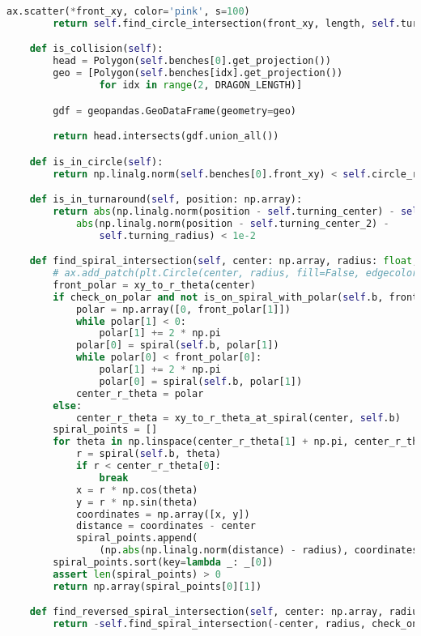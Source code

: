 \begin{lstlisting}[language=python]
        ax.scatter(*front_xy, color='pink', s=100)
        return self.find_circle_intersection(front_xy, length, self.turning_center, self.turning_radius)

    def is_collision(self):
        head = Polygon(self.benches[0].get_projection())
        geo = [Polygon(self.benches[idx].get_projection())
                for idx in range(2, DRAGON_LENGTH)]

        gdf = geopandas.GeoDataFrame(geometry=geo)

        return head.intersects(gdf.union_all())

    def is_in_circle(self):
        return np.linalg.norm(self.benches[0].front_xy) < self.circle_radius

    def is_in_turnaround(self, position: np.array):
        return abs(np.linalg.norm(position - self.turning_center) - self.turning_radius) < 1e-2 or \
            abs(np.linalg.norm(position - self.turning_center_2) -
                self.turning_radius) < 1e-2

    def find_spiral_intersection(self, center: np.array, radius: float, check_on_polar=False) -> np.array:
        # ax.add_patch(plt.Circle(center, radius, fill=False, edgecolor='purple'))
        front_polar = xy_to_r_theta(center)
        if check_on_polar and not is_on_spiral_with_polar(self.b, front_polar):
            polar = np.array([0, front_polar[1]])
            while polar[1] < 0:
                polar[1] += 2 * np.pi
            polar[0] = spiral(self.b, polar[1])
            while polar[0] < front_polar[0]:
                polar[1] += 2 * np.pi
                polar[0] = spiral(self.b, polar[1])
            center_r_theta = polar
        else:
            center_r_theta = xy_to_r_theta_at_spiral(center, self.b)
        spiral_points = []
        for theta in np.linspace(center_r_theta[1] + np.pi, center_r_theta[1] - np.pi, 200):
            r = spiral(self.b, theta)
            if r < center_r_theta[0]:
                break
            x = r * np.cos(theta)
            y = r * np.sin(theta)
            coordinates = np.array([x, y])
            distance = coordinates - center
            spiral_points.append(
                (np.abs(np.linalg.norm(distance) - radius), coordinates))
        spiral_points.sort(key=lambda _: _[0])
        assert len(spiral_points) > 0
        return np.array(spiral_points[0][1])

    def find_reversed_spiral_intersection(self, center: np.array, radius: float, check_on_polar=False) -> np.array:
        return -self.find_spiral_intersection(-center, radius, check_on_polar)


\end{lstlisting}
